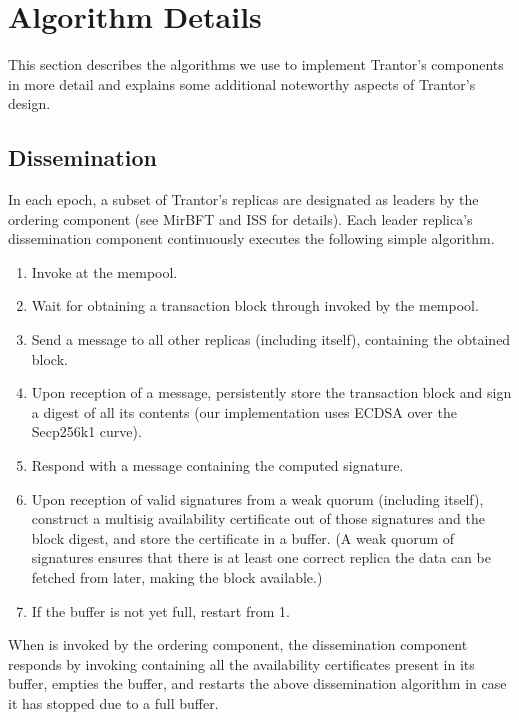\documentclass{article}
\begin{document}
\section{Algorithm Details}
\label{sec:algorithm-details}

This section describes the algorithms we use to implement Trantor’s components in more detail
and explains some additional noteworthy aspects of Trantor’s design.

\subsection{Dissemination}
\label{sec:dissemination}

In each epoch, a subset of Trantor’s replicas are designated as leaders by the ordering component
(see MirBFT \cite{mirbft} and ISS \cite{iss} for details).
Each leader replica’s dissemination component continuously executes the following simple algorithm.

\begin{enumerate}
\item Invoke  at the mempool.
\item Wait for obtaining a transaction block through  invoked by the mempool.
\item Send a  message to all other replicas (including itself), containing the obtained block.
\item Upon reception of a  message,
persistently store the transaction block and sign a digest of all its contents
(our implementation uses ECDSA over the Secp256k1 curve).
\item Respond with a  message containing the computed signature.
\item Upon reception of valid signatures from a weak quorum (including itself),
construct a multisig availability certificate out of those signatures and the block digest,
and store the certificate in a buffer.
(A weak quorum of signatures ensures that there is at least one correct replica the data can be fetched from later,
making the block available.)
\item If the buffer is not yet full, restart from 1.
\end{enumerate}

When  is invoked by the ordering component,
the dissemination component responds by invoking 
containing all the availability certificates present in its buffer, empties the buffer,
and restarts the above dissemination algorithm in case it has stopped due to a full buffer.
\end{document}
